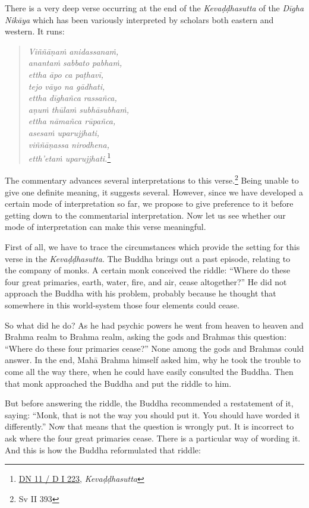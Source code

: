 There is a very deep verse occurring at the end of the \emph{Kevaḍḍhasutta} of the \emph{Dīgha Nikāya} which has been variously interpreted by scholars both eastern and western. It runs:

\begin{quote}
\emph{Viññāṇaṁ anidassanaṁ,}\\
\emph{anantaṁ sabbato pabhaṁ,}\\
\emph{ettha āpo ca paṭhavī,}\\
\emph{tejo vāyo na gādhati,}\\
\emph{ettha dīghañca rassañca,}\\
\emph{aṇuṁ thūlaṁ subhāsubhaṁ,}\\
\emph{ettha nāmañca rūpañca,}\\
\emph{asesaṁ uparujjhati,}\\
\emph{viññāṇassa nirodhena,}\\
\emph{etth'etaṁ uparujjhati.}\footnote{\href{https://suttacentral.net/dn11/pli/ms}{DN 11 / D I 223}, \emph{Kevaḍḍhasutta}}
\end{quote}

The commentary advances several interpretations to this verse.\footnote{Sv II 393} Being unable to give one definite meaning, it suggests several. However, since we have developed a certain mode of interpretation so far, we propose to give preference to it before getting down to the commentarial interpretation. Now let us see whether our mode of interpretation can make this verse meaningful.

First of all, we have to trace the circumstances which provide the setting for this verse in the \emph{Kevaḍḍhasutta}. The Buddha brings out a past episode, relating to the company of monks. A certain monk conceived the riddle: ``Where do these four great primaries, earth, water, fire, and air, cease altogether?'' He did not approach the Buddha with his problem, probably because he thought that somewhere in this world-system those four elements could cease.

So what did he do? As he had psychic powers he went from heaven to heaven and Brahma realm to Brahma realm, asking the gods and Brahmas this question: ``Where do these four primaries cease?'' None among the gods and Brahmas could answer. In the end, Mahā Brahma himself asked him, why he took the trouble to come all the way there, when he could have easily consulted the Buddha. Then that monk approached the Buddha and put the riddle to him.

But before answering the riddle, the Buddha recommended a restatement of it, saying: ``Monk, that is not the way you should put it. You should have worded it differently.'' Now that means that the question is wrongly put. It is incorrect to ask where the four great primaries cease. There is a particular way of wording it. And this is how the Buddha reformulated that riddle:


